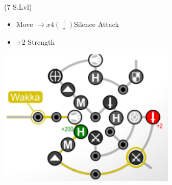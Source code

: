 \begin{spheregrid}
\begin{itemize}
    \wakkaf (7 S.Lvl)
    \begin{itemize}
      \item Move $\rightarrow x4 (\downarrow)$Silence Attack
      \item +2 Strength
    \end{itemize}
    \includegraphics{graphics/wakkammr}
  \end{itemize}
\end{spheregrid}
\vfill
